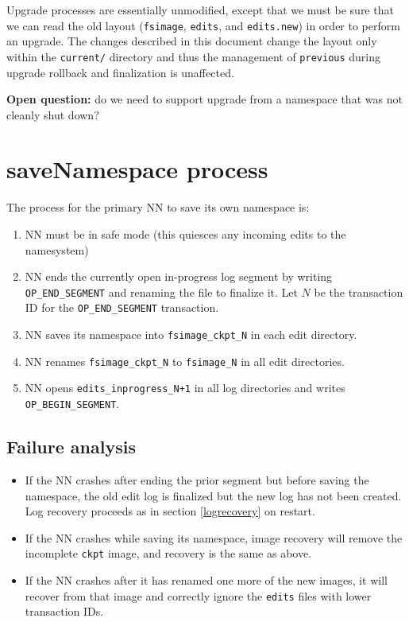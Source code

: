 \documentclass{article}
\begin{document}
Upgrade processes are essentially unmodified, except that we must be sure that we can read the old layout ({\tt fsimage}, {\tt edits}, and {\tt edits.new}) in order to perform an upgrade. The changes described in this document change the layout only within the {\tt current/} directory and thus the management of {\tt previous} during upgrade rollback and finalization is unaffected.

{\bf Open question:} do we need to support upgrade from a namespace that was not cleanly shut down?

\section{saveNamespace process}

The process for the primary NN to save its own namespace is:

\begin{enumerate}
\item NN must be in safe mode (this quiesces any incoming edits to the namesystem)
\item NN ends the currently open in-progress log segment by writing {\tt OP\_END\_SEGMENT} and renaming the file to finalize it.
Let $N$ be the transaction ID for the {\tt OP\_END\_SEGMENT} transaction.
\item NN saves its namespace into {\tt fsimage\_ckpt\_N} in each edit directory.
\item NN renames {\tt fsimage\_ckpt\_N} to {\tt fsimage\_N} in all edit directories.
\item NN opens {\tt edits\_inprogress\_N+1} in all log directories and writes {\tt OP\_BEGIN\_SEGMENT}.
\end{enumerate}

\subsection{Failure analysis}

\begin{itemize}
\item If the NN crashes after ending the prior segment but before saving the namespace,
the old edit log is finalized but the new log has not been created.
Log recovery proceeds as in section \ref{logrecovery} on restart.
\item If the NN crashes while saving its namespace, image recovery will remove the incomplete {\tt ckpt} image, and recovery is the same as above.
\item If the NN crashes after it has renamed one more of the new images, it will recover from that image and correctly ignore the {\tt edits} files with lower transaction IDs.
\end{itemize}
\end{document}
